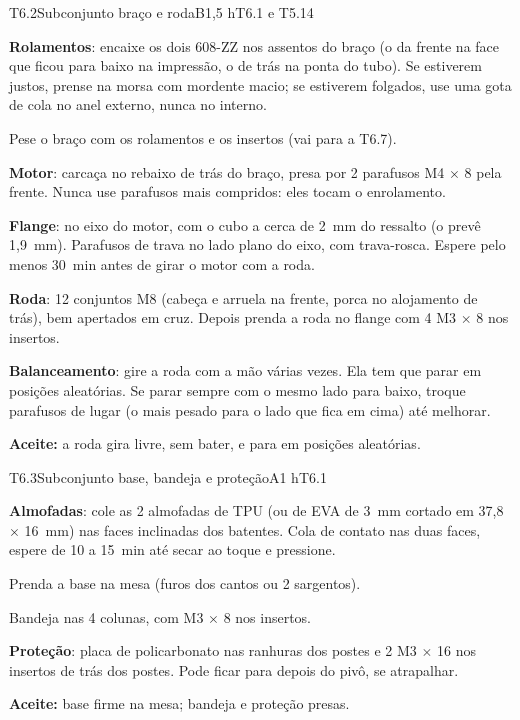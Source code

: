 \documentclass[11pt,a4paper]{article}
\newcommand{\cmd}[1]{\texttt{\detokenize{#1}}}   %
\begin{document}
\begin{tarefa}[critica]{T6.2}{Subconjunto braço e roda}{B}{1,5 h}{T6.1 e T5.14}
\begin{passos}
  \item \textbf{Rolamentos}: encaixe os dois 608-ZZ nos assentos do braço (o da frente na
    face que ficou para baixo na impressão, o de trás na ponta do tubo). Se estiverem justos,
    prense na morsa com mordente macio; se estiverem folgados, use uma gota de cola no anel
    externo, nunca no interno.
  \item Pese o braço com os rolamentos e os insertos (vai para a T6.7).
  \item \textbf{Motor}: carcaça no rebaixo de trás do braço, presa por 2 parafusos
    M4 $\times$ 8 pela frente. Nunca use parafusos mais compridos: eles tocam o enrolamento.
  \item \textbf{Flange}: no eixo do motor, com o cubo a cerca de 2~mm do ressalto (o
    \cmd{folgas.py} prevê 1,9~mm). Parafusos de trava no lado plano do eixo, com trava-rosca.
    Espere pelo menos 30~min antes de girar o motor com a roda.
  \item \textbf{Roda}: 12 conjuntos M8 (cabeça e arruela na frente, porca no alojamento de
    trás), bem apertados em cruz. Depois prenda a roda no flange com 4 M3 $\times$ 8 nos
    insertos.
  \item \textbf{Balanceamento}: gire a roda com a mão várias vezes. Ela tem que parar em
    posições aleatórias. Se parar sempre com o mesmo lado para baixo, troque parafusos de
    lugar (o mais pesado para o lado que fica em cima) até melhorar.
\end{passos}
\textbf{Aceite:} a roda gira livre, sem bater, e para em posições aleatórias.
\end{tarefa}

\begin{tarefa}{T6.3}{Subconjunto base, bandeja e proteção}{A}{1 h}{T6.1}
\begin{passos}
  \item \textbf{Almofadas}: cole as 2 almofadas de TPU (ou de EVA de 3~mm cortado em
    37,8 $\times$ 16~mm) nas faces inclinadas dos batentes. Cola de contato nas duas faces,
    espere de 10 a 15~min até secar ao toque e pressione.
  \item Prenda a base na mesa (furos dos cantos ou 2 sargentos).
  \item Bandeja nas 4 colunas, com M3 $\times$ 8 nos insertos.
  \item \textbf{Proteção}: placa de policarbonato nas ranhuras dos postes e 2 M3 $\times$ 16
    nos insertos de trás dos postes. Pode ficar para depois do pivô, se atrapalhar.
\end{passos}
\textbf{Aceite:} base firme na mesa; bandeja e proteção presas.
\end{tarefa}
\end{document}
